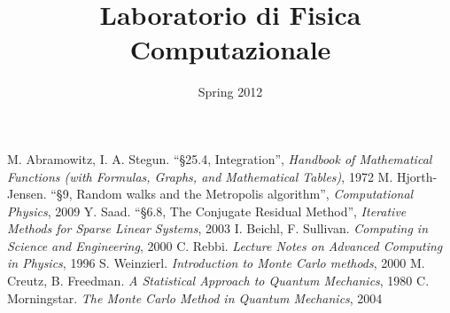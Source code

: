 \documentclass[a4paper,11pt]{report}
\title{\bfseries{\Huge{Laboratorio di Fisica Computazionale}}}
\author{\cursiveshape {Luca Cassia - [MAT. 728341]}}
\date{Spring 2012}
\begin{document}
\maketitle
\tableofcontents






\begin{thebibliography}{9}
 M. Abramowitz, I. A. Stegun. ``§25.4, Integration'', \textit{Handbook of Mathematical Functions (with Formulas, Graphs, and Mathematical Tables)}, 1972
 M. Hjorth-Jensen. ``§9, Random walks and the Metropolis algorithm'', \textit{Computational Physics}, 2009
 Y. Saad. ``§6.8, The Conjugate Residual Method'', \textit{Iterative Methods for Sparse Linear Systems}, 2003
 I. Beichl, F. Sullivan. \textit{Computing in Science and Engineering}, 2000
 C. Rebbi. \textit{Lecture Notes on Advanced Computing in Physics}, 1996
 S. Weinzierl. \textit{Introduction to Monte Carlo methods}, 2000
 M. Creutz, B. Freedman. \textit{A Statistical Approach to Quantum Mechanics}, 1980
 C. Morningstar. \textit{The Monte Carlo Method in Quantum Mechanics}, 2004
\end{thebibliography} 
\end{document}
